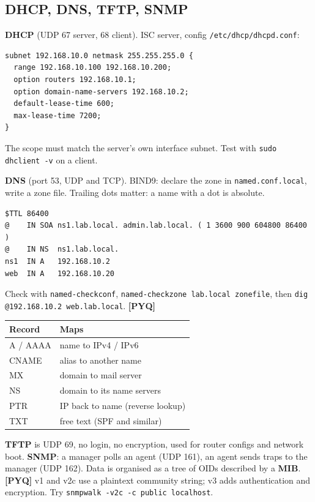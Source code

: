 \documentclass[11pt,a4paper]{article}
\newcommand{\pyq}{\textcolor{ember}{\scriptsize\textbf{[PYQ]}}}
\begin{document}
\subsection{DHCP, DNS, TFTP, SNMP}
\textbf{DHCP} (UDP 67 server, 68 client). ISC server, config \texttt{/etc/dhcp/dhcpd.conf}:

\begin{lstlisting}
subnet 192.168.10.0 netmask 255.255.255.0 {
  range 192.168.10.100 192.168.10.200;
  option routers 192.168.10.1;
  option domain-name-servers 192.168.10.2;
  default-lease-time 600;
  max-lease-time 7200;
}
\end{lstlisting}
The scope must match the server's own interface subnet. Test with \texttt{sudo dhclient -v} on a client.

\textbf{DNS} (port 53, UDP and TCP). BIND9: declare the zone in \texttt{named.conf.local}, write a zone file. Trailing dots matter: a name with a dot is absolute.

\begin{lstlisting}
$TTL 86400
@    IN SOA ns1.lab.local. admin.lab.local. ( 1 3600 900 604800 86400 )
@    IN NS  ns1.lab.local.
ns1  IN A   192.168.10.2
web  IN A   192.168.10.20
\end{lstlisting}
Check with \texttt{named-checkconf}, \texttt{named-checkzone lab.local zonefile}, then \texttt{dig @192.168.10.2 web.lab.local}. \pyq{}

\begin{center}\small\renewcommand{\arraystretch}{1.18}\setlength{\tabcolsep}{9pt}
\begin{tabularx}{\linewidth}{@{}l>{\raggedright\arraybackslash}X@{}}
\toprule
\textbf{\color{slate}Record} & \textbf{\color{slate}Maps} \\ \midrule
A / AAAA & name to IPv4 / IPv6 \\
CNAME & alias to another name \\
MX & domain to mail server \\
NS & domain to its name servers \\
PTR & IP back to name (reverse lookup) \\
TXT & free text (SPF and similar) \\
\bottomrule
\end{tabularx}\end{center}
\textbf{TFTP} is UDP 69, no login, no encryption, used for router configs and network boot. \textbf{SNMP}: a manager polls an agent (UDP 161), an agent sends traps to the manager (UDP 162). Data is organised as a tree of OIDs described by a \textbf{MIB}. \pyq{} v1 and v2c use a plaintext community string; v3 adds authentication and encryption. Try \texttt{snmpwalk -v2c -c public localhost}.
\end{document}
